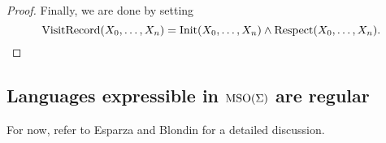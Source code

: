 \documentclass[11pt,twoside=off,numbers=noenddot]{scrbook}
\begin{document}
\begin{proof}
  Finally, we are done by setting
  \[ \text{VisitRecord}(X_0, \dots, X_n) = \text{Init}(X_0, \dots, X_n) \wedge
  \text{Respect}(X_0, \dots, X_n). \]
\end{proof}

\subsection{Languages expressible in $\text{MSO}(\Sigma)$ are regular}
For now, refer to Esparza and Blondin \cite{esparza2023automata} for
a detailed discussion.

\printbibliography[nottype=image]
\end{document}

